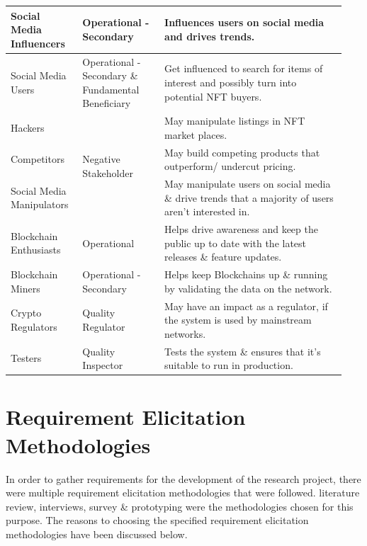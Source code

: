 \begin{longtable}{|p{0.2\linewidth}|p{0.23\linewidth}|p{0.51\linewidth}|}
\hline
Social Media Influencers & Operational - Secondary & Influences users on social media and drives trends. \\* 
\hline
Social Media Users & Operational - Secondary \& Fundamental Beneficiary & Get influenced to search for items of interest and possibly turn into potential NFT buyers. \\* 
\hline
Hackers & \multirow{3}{*}{Negative Stakeholder} & May manipulate listings in NFT market places. \\* 
\cline{1-1}\cline{3-3}
Competitors &  & May build competing products that outperform/ undercut pricing. \\* 
\cline{1-1}\cline{3-3}
Social Media Manipulators &  & May manipulate users on social media \& drive trends that a majority of users aren’t interested in. \\ 
\hline
Blockchain Enthusiasts & Operational & Helps drive awareness and keep the public up to date with the latest releases \& feature updates. \\ 
\hline
Blockchain Miners & Operational - Secondary & Helps keep Blockchains up \& running by validating the data on the network. \\ 
\hline
Crypto Regulators & Quality Regulator & May have an impact as a regulator, if the system is used by mainstream networks.\\
\hline
Testers & Quality Inspector & Tests the system \& ensures that it's suitable to run in production.\\
\hline
\end{longtable}


\section{Requirement Elicitation Methodologies}
In order to gather requirements for the development of the research project, there were multiple requirement elicitation methodologies that were followed. literature review, interviews, survey \& prototyping were the methodologies chosen for this purpose.
The reasons to choosing the specified requirement elicitation methodologies have been discussed below.

\pagebreak

